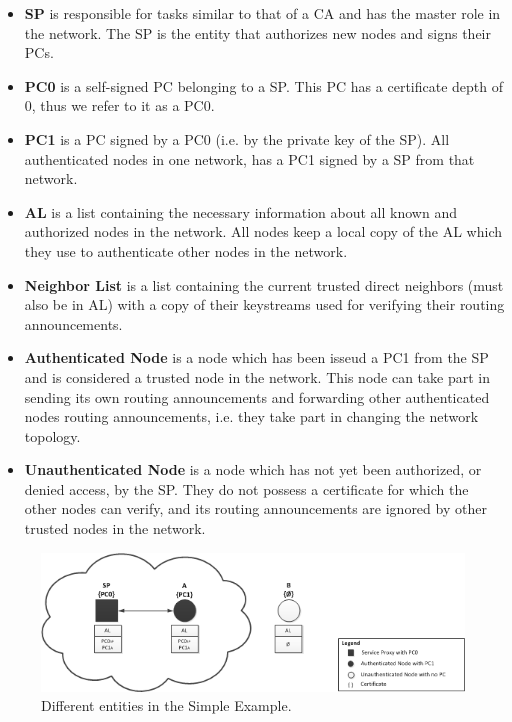 \begin{itemize}
  \item \textbf{\acf{SP}} is responsible for tasks similar to that of a \ac{CA}
  	and has the master role in the network. The \ac{SP} is the entity that
 	 authorizes new nodes and signs their \acp{PC}.
  \item \textbf{\acf{PC0}} is a self-signed \ac{PC} belonging to a
  	\ac{SP}. This \ac{PC} has a certificate depth of 0, thus we refer to it as a
  	\ac{PC0}.
  \item \textbf{\acf{PC1}} is a \ac{PC} signed by a \ac{PC0} (i.e. by the
  private key of the \ac{SP}). All authenticated nodes in one network, has a
  \ac{PC1} signed by a \ac{SP} from that network.
  \item \textbf{\acf{AL}} is a list containing the necessary information about
 	all known and authorized nodes in the network. All nodes keep a local copy of
 	the \ac{AL} which they use to authenticate other nodes in the network.
  \item \textbf{Neighbor List} is a list containing the current trusted direct
    neighbors (must also be in \ac{AL}) with a copy of their keystreams used for
    verifying their routing announcements.
  \item \textbf{Authenticated Node} is a node which has been isseud a \ac{PC1}
    from the \ac{SP} and is considered a trusted node in the network. This node
    can take part in sending its own routing announcements and forwarding other
    authenticated nodes routing announcements, i.e. they take part in changing
    the network topology.
  \item \textbf{Unauthenticated Node} is a node which has not yet been
    authorized, or denied access, by the \ac{SP}. They do not possess a
    certificate for which the other nodes can verify, and its routing
    announcements are ignored by other trusted nodes in the network.
\end{itemize}

\begin{figure}[h]
	\centering
  	\includegraphics[width=\textwidth]{images/simple_example_entities.png}
  	\caption{Different entities in the Simple Example.}
	\label{fig:simple_example_entities}
\end{figure}

